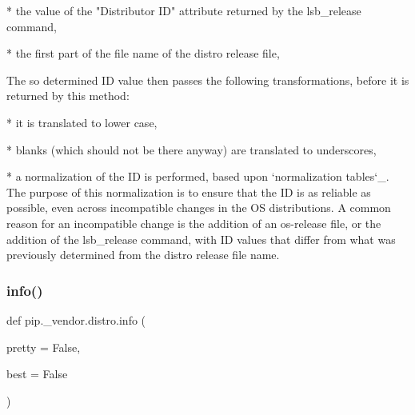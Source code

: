 \begin{DoxyVerb}
* the value of the "Distributor ID" attribute returned by the lsb_release
  command,

* the first part of the file name of the distro release file,

The so determined ID value then passes the following transformations,
before it is returned by this method:

* it is translated to lower case,

* blanks (which should not be there anyway) are translated to underscores,

* a normalization of the ID is performed, based upon
  `normalization tables`_. The purpose of this normalization is to ensure
  that the ID is as reliable as possible, even across incompatible changes
  in the OS distributions. A common reason for an incompatible change is
  the addition of an os-release file, or the addition of the lsb_release
  command, with ID values that differ from what was previously determined
  from the distro release file name.
\end{DoxyVerb}
 \mbox{\label{namespacepip_1_1__vendor_1_1distro_a80146cc8c9c2f6d751f2754996ae5157}} 
\subsubsection{\texorpdfstring{info()}{info()}}
{\footnotesize\ttfamily def pip.\+\_\+vendor.\+distro.\+info (\begin{DoxyParamCaption}\item[{}]{pretty = {\ttfamily False},  }\item[{}]{best = {\ttfamily False} }\end{DoxyParamCaption})}

